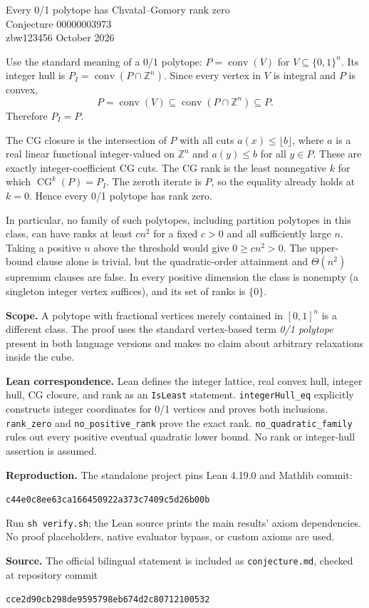 \documentclass[11pt]{article}
\begin{document}
\begin{center}{\Large Every 0/1 polytope has Chvatal--Gomory rank zero}\\[6pt]
{\large Conjecture 00000003973}\\[5pt]
zbw123456  October 2026\end{center}

Use the standard meaning of a 0/1 polytope:
$P=\operatorname{conv}(V)$ for $V\subseteq\{0,1\}^n$.
Its integer hull is $P_I=\operatorname{conv}(P\cap\mathbb Z^n)$.
Since every vertex in $V$ is integral and $P$ is convex,
\[
P=\operatorname{conv}(V)\subseteq
\operatorname{conv}(P\cap\mathbb Z^n)\subseteq P.
\]
Therefore $P_I=P$.

The CG closure is the intersection of $P$ with all cuts
$a(x)\le\lfloor b\rfloor$, where $a$ is a real linear functional
integer-valued on $\mathbb Z^n$ and $a(y)\le b$ for all $y\in P$.
These are exactly integer-coefficient CG cuts.
The CG rank is the least nonnegative $k$ for which
$\operatorname{CG}^k(P)=P_I$. The zeroth iterate is $P$, so the equality
already holds at $k=0$. Hence every 0/1 polytope has rank zero.

In particular, no family of such polytopes, including partition
polytopes in this class, can have ranks at least $c n^2$ for a fixed
$c>0$ and all sufficiently large $n$. Taking a positive $n$ above the
threshold would give $0\ge c n^2>0$.
The upper-bound clause alone is trivial, but the quadratic-order
attainment and $\Theta(n^2)$ supremum clauses are false.
In every positive dimension the class is nonempty (a singleton integer
vertex suffices), and its set of ranks is $\{0\}$.

\textbf{Scope.} A polytope with fractional vertices merely contained in
$[0,1]^n$ is a different class. The proof uses the standard vertex-based
term \emph{0/1 polytope} present in both language versions and makes no
claim about arbitrary relaxations inside the cube.

\textbf{Lean correspondence.} Lean defines the integer lattice, real
convex hull, integer hull, CG closure, and rank as an \texttt{IsLeast}
statement. \texttt{integerHull\_eq} explicitly constructs integer coordinates
for 0/1 vertices and proves both inclusions.
\texttt{rank\_zero} and \texttt{no\_positive\_rank} prove the exact rank.
\texttt{no\_quadratic\_family} rules out every positive eventual quadratic
lower bound. No rank or integer-hull assertion is assumed.

\textbf{Reproduction.} The standalone project pins Lean 4.19.0 and Mathlib
commit:
\begin{center}\small\texttt{c44e0c8ee63ca166450922a373c7409c5d26b00b}\end{center}
Run \texttt{sh verify.sh}; the Lean source prints the main results'
axiom dependencies. No proof placeholders, native evaluator bypass, or
custom axioms are used.

\textbf{Source.} The official bilingual statement is included as
\texttt{conjecture.md}, checked at repository commit
\begin{center}\small\texttt{cce2d90cb298de9595798eb674d2c80712100532}\end{center}
\end{document}
